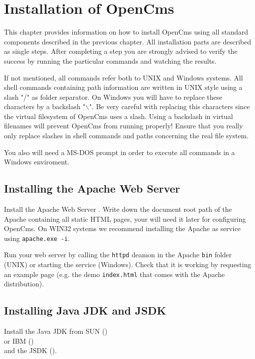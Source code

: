 \chapter{\label{42install}Installation of OpenCms}
This chapter provides information on how to install OpenCms using
all standard components described in the previous chapter. All installation
parts are described as single steps. After completing a step you are strongly
advised to verify the success by running the particular commands and 
watching the results.

If not mentioned, all commands refer both to UNIX and Windows systems.
All shell commands containing path information are written in UNIX style using
a slash "/" as folder separator. On Windows you will have to
replace these characters by a backslash "$\backslash$". 
Be very careful with replacing this characters since the virtual filesystem
of OpenCms uses a slash. Using a backslash in virtual filenames will 
prevent OpenCms from running properly! Ensure that you really only replace
slashes in shell commands and paths concerning the real file system.

You also will need a 
MS-DOS prompt in order to execute all commands in a Windows enviroment.

\section{\label{42apache}Installing the Apache Web Server}

Install the Apache Web Server . 
Write down the document root path of the Apache containing all static HTML 
pages, your will need it later for configuring OpenCms.
On WIN32 systems we recommend installing the Apache as service
using \texttt{apache.exe -i}. 

Run your web server by calling the \texttt{httpd} deamon in the Apache
\texttt{bin} folder (UNIX)
or starting the service (Windows). Check that it
is working by requesting an example page 
(e.g. the demo \texttt{index.html} that comes with the Apache distribution).


\section{\label{42jdk}Installing Java JDK and JSDK}
Install the Java JDK from SUN 
()\\
or IBM () \\
and the JSDK 
().

